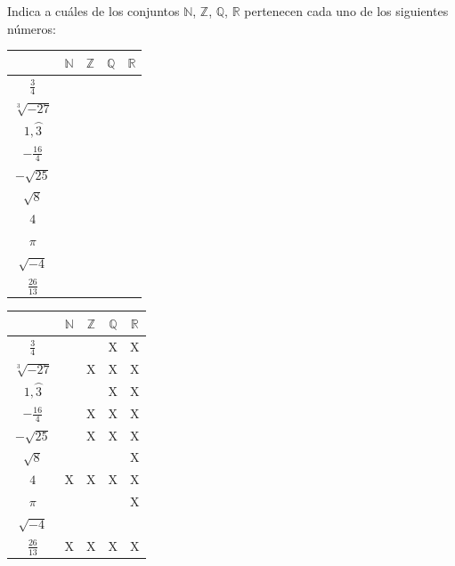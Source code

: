 \documentclass[addpoints,spanish, 12pt,a4paper]{exam}
\begin{document}
\begin{questions}

\addpoints

\question[2] Indica a cuáles de los conjuntos
$\mathbb{N}$, $\mathbb{Z}$, $\mathbb{Q}$, $\mathbb{R}$ pertenecen cada uno de los siguientes números:
\begin{center}
\begin{tabular}{|c |c |c |c |c|}\hline
&$\mathbb{N}$& $\mathbb{Z}$& $\mathbb{Q}$&$\mathbb{R}$\\ 
\hline
$\frac{3}{4}$&&&&\\
\hline
$\sqrt[3]{-27}$&&&&\\
\hline
$1,\wideparen{3}$&&&&\\
\hline
$-\frac{16}{4}$&&&&\\
\hline
$-\sqrt{25}$&&&&\\
\hline
$\sqrt{8}$&&&&\\
\hline
$4$&&&&\\
\hline
$\pi$&&&&\\
\hline
$\sqrt{-4}$&&&&\\
\hline
$\frac{26}{13}$&&&&\\
\hline
\end{tabular}

\end{center}

\begin{solution}
\begin{tabular}{|c |c |c |c |c|}\hline
&$\mathbb{N}$& $\mathbb{Z}$& $\mathbb{Q}$&$\mathbb{R}$\\ 
\hline
$\frac{3}{4}$&&&X&X\\
\hline
$\sqrt[3]{-27}$&&X&X&X\\
\hline
$1,\wideparen{3}$&&&X&X\\
\hline
$-\frac{16}{4}$&&X&X&X\\
\hline
$-\sqrt{25}$&&X&X&X\\
\hline
$\sqrt{8}$&&&&X\\
\hline
$4$&X&X&X&X\\
\hline
$\pi$&&&&X\\
\hline
$\sqrt{-4}$&&&&\\
\hline
$\frac{26}{13}$&X&X&X&X\\
\hline
\end{tabular}
\end{solution}


\end{questions}
\end{document}
